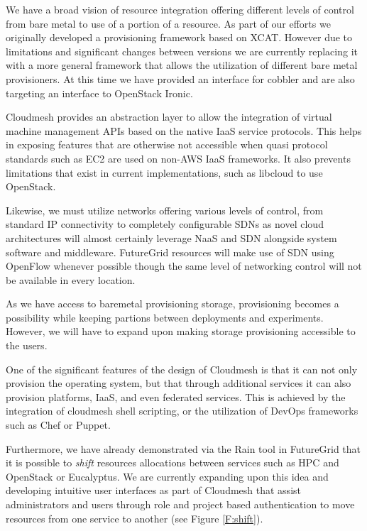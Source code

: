 \documentclass{tex/sig-alternate-2013}
\begin{document}
\begin{description}[leftmargin=0pt,itemsep=0pt,topsep=0pt]

\item[Baremetal Provisioning.] We have a broad vision of resource
  integration offering different levels of control from bare
  metal to use of a portion of a resource. As part of our efforts we
  originally developed a provisioning framework based on XCAT. However
  due to limitations and significant changes between versions we are
  currently replacing it with a more general framework that allows the
  utilization of different bare metal provisioners. At this time we
  have provided an interface for cobbler and are also targeting an
  interface to OpenStack Ironic.

\item[Virtual Machine Provisioning.] Cloudmesh provides an abstraction
  layer to allow the integration of virtual machine management APIs
  based on the native IaaS service protocols. This helps in exposing
  features that are otherwise not accessible when quasi protocol
  standards such as EC2 are used on non-AWS IaaS frameworks. It also
  prevents limitations that exist in current implementations, such as
  libcloud to use OpenStack.

\item[Network Provisioning.] Likewise, we must utilize networks
offering various levels of control, from standard IP connectivity to
completely configurable SDNs as novel cloud architectures will almost
certainly leverage NaaS and SDN alongside system software and
middleware. FutureGrid resources will make use of SDN using OpenFlow
whenever possible though the same level of networking control will not be
available in every location.

\item[Storage Provisioning.] As we have access to baremetal
  provisioning storage, provisioning becomes a possibility while
  keeping partions between deployments and experiments. However, we
  will have to expand upon making storage provisioning accessible to
  the users.

\item[Platform, IaaS, and Federated Provisioning.] One of the
  significant features of the design of Cloudmesh is that it can not only
  provision the operating system, but that through additional services
  it can also provision platforms, IaaS, and even federated
  services. This is achieved by the integration of cloudmesh shell
  scripting, or the utilization of DevOps frameworks such as Chef or Puppet. 

  Furthermore, we have already demonstrated via the Rain tool in
  FutureGrid that it is possible to {\em shift} resources
  allocations between services such as HPC and OpenStack or
  Eucalyptus. We are currently expanding upon this idea and developing
  intuitive user interfaces as part of Cloudmesh that assist
  administrators and users through role and project based
  authentication to move resources from one service to another (see
  Figure \ref{F:shift}).

\end{description}
\end{document}
